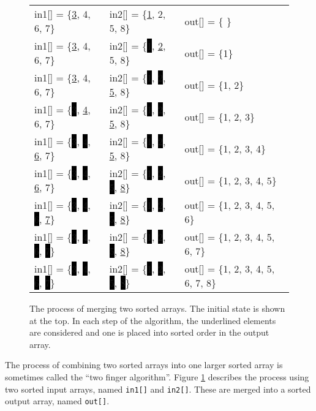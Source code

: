 \begin{figure}
\centering
\setlength{\fboxsep}{0pt}
\begin{scriptsize}
\begin{tabular} {l l l } 
in1[] = \{\underline{3}, 4, 6, 7\} & in2[] = \{\underline{1}, 2, 5, 8\} & out[] = \{ \} \\
in1[] = \{\underline{3}, 4, 6, 7\} & in2[] = \{\colorbox{black}{1}, \underline{2}, 5, 8\}  & out[] = \{1\} \\
in1[] = \{\underline{3}, 4, 6, 7\} & in2[] = \{\colorbox{black}{1}, \colorbox{black}{2}, \underline{5}, 8\} & out[] = \{1, 2\} \\
in1[] = \{\colorbox{black}{3}, \underline{4}, 6, 7\} & in2[] = \{\colorbox{black}{1}, \colorbox{black}{2}, \underline{5}, 8\} & out[] = \{1, 2, 3\} \\
in1[] = \{\colorbox{black}{3}, \colorbox{black}{4}, \underline{6}, 7\} & in2[] = \{\colorbox{black}{1}, \colorbox{black}{2}, \underline{5}, 8\}  & out[] = \{1, 2, 3, 4\} \\
in1[] = \{\colorbox{black}{3}, \colorbox{black}{4}, \underline{6}, 7\} & in2[] = \{\colorbox{black}{1}, \colorbox{black}{2}, \colorbox{black}{5}, \underline{8}\}  & out[] = \{1, 2, 3, 4, 5\} \\
in1[] = \{\colorbox{black}{3}, \colorbox{black}{4}, \colorbox{black}{6}, \underline{7}\}  & in2[] = \{\colorbox{black}{1}, \colorbox{black}{2}, \colorbox{black}{5}, \underline{8}\}  &out[] = \{1, 2, 3, 4, 5, 6\} \\
in1[] = \{\colorbox{black}{3}, \colorbox{black}{4}, \colorbox{black}{6}, \colorbox{black}{7}\}  & in2[] = \{\colorbox{black}{1}, \colorbox{black}{2}, \colorbox{black}{5}, \underline{8}\}  &out[] = \{1, 2, 3, 4, 5, 6, 7\} \\
in1[] = \{\colorbox{black}{3}, \colorbox{black}{4}, \colorbox{black}{6}, \colorbox{black}{7}\}  & in2[] = \{\colorbox{black}{1}, \colorbox{black}{2}, \colorbox{black}{5}, \colorbox{black}{8}\} &out[] = \{1, 2, 3, 4, 5, 6, 7, 8\} \\
\end{tabular}
\end{scriptsize}
\caption{The process of merging two sorted arrays.  The initial state is shown at the top.  In each step of the algorithm, the underlined elements are considered and one is placed into sorted order in the output array.}
\label{fig:merge_behavior}
\end{figure}

The process of combining two sorted arrays into one larger sorted array is sometimes called the ``two finger algorithm''.  Figure \ref{fig:merge_behavior} describes the process using two sorted input arrays, named \lstinline{in1[]} and \lstinline{in2[]}. These are merged into a sorted output array, named \lstinline{out[]}.

